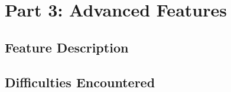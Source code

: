 \section{Part 3: Advanced Features}

\subsection{Feature Description}

\subsection{Difficulties Encountered}
